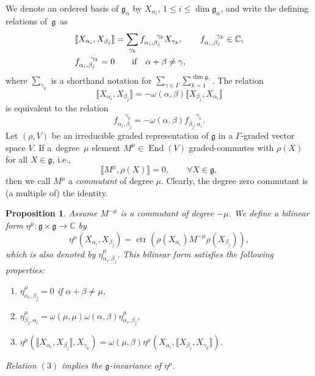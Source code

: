 \documentclass[10pt,a4paper]{amsart}
\numberwithin{equation}{section}
\newtheorem{Proposition}[Theorem]{Proposition}
\theoremstyle{definition}
\def\nn{\notag}
\def\g{\mathfrak{g}}
\begin{document}
We denote an ordered basis of $\g_{\alpha}$ by $ X_{\alpha_i}$, $1 \leq i \leq \dim \g_{\alpha}$, and write the defining relations of~$\g$~as
\begin{align}
	& 	\llbracket X_{\alpha_i}, X_{\beta_j} \rrbracket = \sum_{\gamma_k} f_{\alpha_i, \beta_j}^{\quad\ \gamma_k} X_{\gamma_k}, \qquad f_{\alpha_i, \beta_j}^{\quad\ \gamma_k} \in \mathbb{C}, \label{sumgammak}
	\\
	& f_{\alpha_i, \beta_j}^{\quad\ \gamma_k} = 0 \qquad \text{if} \quad \alpha + \beta \neq \gamma, \nn
\end{align}
where $\sum_{\gamma_k}$ is a shorthand notation for $\sum_{\gamma \in \Gamma} \sum_{k=1}^{\dim \g_{\gamma}}$.
The relation
\[
\llbracket X_{\alpha_i}, X_{\beta_j} \rrbracket = -\omega(\alpha,\beta) \llbracket X_{\beta_j}, X_{\alpha_i} \rrbracket
\]
 is equivalent to the relation
\begin{equation}
	f_{\alpha_i, \beta_j}^{\quad\ \gamma_k} = -\omega(\alpha,\beta) f_{\beta_j,\alpha_i}^{\quad\ \gamma_k}.
	\label{fskew}
\end{equation}
Let $(\rho,V)$ be an irreducible graded representation of $\g$ in a $\Gamma$-graded vector space $V$.
If a~degree~$\mu$ element $ M^{\mu} \in \operatorname{End}(V)$ graded-commutes with $\rho(X)$ for all $ X \in \g$, i.e.,
\begin{equation*}
	\llbracket M^{\mu}, \rho(X) \rrbracket = 0, \qquad \forall X \in \g,
\end{equation*}
then we call $M^{\mu}$ a \textit{commutant} of degree $\mu$.
Clearly, the degree zero commutant is (a multiple of) the identity.

\begin{Proposition} \label{PROP:BF}
Assume $M^{-\mu}$ is a commutant of degree $-\mu$.
	We define a bilinear form $\eta^{\mu}\colon \g \times \g \to \mathbb{C}$ by
	\begin{equation*}
		\eta^{\mu}(X_{\alpha_i}, X_{\beta_j}) = \operatorname{ctr}( \rho(X_{\alpha_i}) M^{-\mu} \rho(X_{\beta_j}) ), %
	\end{equation*}
	which is also denoted by $\eta^{\mu}_{\alpha_i,\beta_j}$. This bilinear form satisfies the following properties:
	\begin{enumerate}\itemsep=0pt
		\item[$(1)$] $ \eta^{\mu}_{\alpha_i, \beta_j} = 0$ if $ \alpha + \beta \neq \mu$,
		\item[$(2)$] $ \eta^{\mu}_{\beta_j,\alpha_i} = \omega(\mu,\mu) \omega(\alpha,\beta) \eta^{\mu}_{\alpha_i, \beta_j} $,
		\item[$(3)$] $ \eta^{\mu}(\llbracket X_{\alpha_i}, X_{\beta_j} \rrbracket, X_{\gamma_k} ) = \omega(\mu,\beta) \eta^{\mu}(X_{\alpha_i}, \llbracket X_{\beta_j}, X_{\gamma_k} \rrbracket) $.
	\end{enumerate}
	Relation $(3)$ implies the $\g$-invariance of $\eta^{\mu}$.
\end{Proposition}
\end{document}
